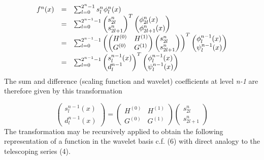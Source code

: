 \documentclass[letterpaper]{book}
\begin{document}
\begin{equation}
\begin{matrix}f^{n}(x)&\text{=}&\sum _{l=0}^{2^{n}-1}{s_{l}^{n}\phi _{l}^{n}(x)}\hfill\null \\\text{}&\text{=}&\sum
_{l=0}^{2^{n-1}-1}{\left(\begin{matrix}s_{2l}^{n}\hfill\null \\s_{2l+1}^{n}\hfill\null
\end{matrix}\right)^{T}\left(\begin{matrix}\phi _{2l}^{n}(x)\hfill\null \\\phi _{2l+1}^{n}(x)\hfill\null
\end{matrix}\right)}\hfill\null \\\text{}&\text{=}&\sum _{l=0}^{2^{n-1}-1}{\left(\left(\begin{matrix}H^{(0)}\hfill\null
&H^{(1)}\hfill\null \\G^{(0)}\hfill\null &G^{(1)}\hfill\null
\end{matrix}\right)\left(\begin{matrix}s_{2l}^{n}\hfill\null \\s_{2l+1}^{n}\hfill\null
\end{matrix}\right)\right)^{T}\left(\begin{matrix}\phi _{l}^{n-1}(x)\hfill\null \\\psi _{l}^{n-1}(x)\hfill\null
\end{matrix}\right)}\hfill\null \\\text{}&\text{=}&\sum
_{l=0}^{2^{n-1}-1}{\left(\begin{matrix}s_{l}^{n-1}(x)\hfill\null \\d_{l}^{n-1}\hfill\null
\end{matrix}\right)^{T}\left(\begin{matrix}\phi _{l}^{n-1}(x)\hfill\null \\\psi _{l}^{n-1}(x)\hfill\null
\end{matrix}\right)}\hfill\null \end{matrix}
\end{equation}
The sum and difference (scaling function and wavelet) coefficients at level \textit{n-1} are therefore given by this
transformation

\begin{equation}
\left(\begin{matrix}s_{l}^{n-1}(x)\\d_{l}^{n-1}(x)\end{matrix}\right)=\left(\begin{matrix}H^{(0)}&H^{(1)}\\G^{(0)}&G^{(1)}\end{matrix}\right)\left(\begin{matrix}s_{2l}^{n}\\s_{2l+1}^{n}\end{matrix}\right)
\end{equation}
The transformation may be recursively applied to obtain the following representation of a function in the wavelet basis
c.f. (6) with direct analogy to the telescoping series (4).
\end{document}
